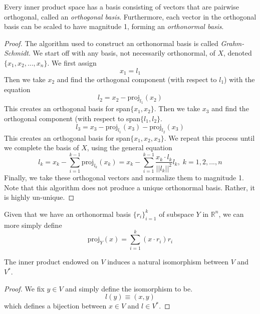 \documentclass{article}
\begin{document}
  \begin{theorem}
    Every inner product space has a basis consisting of vectors that are pairwise orthogonal, called an \textit{orthogonal basis}. Furthermore, each vector in the orthogonal basis can be scaled to have magnitude 1, forming an \textit{orthonormal basis}.  
  \end{theorem}

  \begin{proof}
    The algorithm used to construct an orthonormal basis is called \textit{Grahm-Schmidt}. We start off with any basis, not necessarily orthonormal, of $X$, denoted $\{x_1, x_2, ..., x_n\}$. We first assign 
    \begin{equation}
      x_1 = l_1
    \end{equation}
    Then we take $x_2$ and find the orthogonal component (with respect to $l_1$) with the equation
    \begin{equation}
      l_2 = x_2 - \text{proj}_{l_1} (x_2)
    \end{equation}
    This creates an orthogonal basis for span$\{x_1, x_2\}$. Then we take $x_3$ and find the orthogonal component (with respect to span$\{l_1, l_2\}$. 
    \begin{equation}
      l_3 = x_3 - \text{proj}_{l_1} (x_3) - \text{proj}_{l_2} (x_3)
    \end{equation}
    This creates an orthogonal basis for span$\{x_1, x_2, x_3\}$. We repeat this process until we complete the basis of $X$, using the general equation
    \begin{equation}
      l_k = x_k - \sum_{i=1}^{k-1} \text{proj}_{l_k} (x_k) = x_k - \sum_{i=1}^{k-1} \frac{x_k \cdot l_k}{||l_k||^2} l_k, \; k = 1, 2, ..., n
    \end{equation}
    Finally, we take these orthogonal vectors and normalize them to magnitude 1. Note that this algorithm does not produce a unique orthonormal basis. Rather, it is highly un-unique. 
  \end{proof}

  Given that we have an orthonormal basis $\{r_i\}_{i=1}^k$ of subspace $Y$ in $\mathbb{R}^n$, we can more simply define 
  \begin{equation}
    \text{proj}_Y (x) = \sum_{i=1}^k (x \cdot r_i) r_i
  \end{equation}

  \begin{theorem}
    The inner product endowed on $V$ induces a natural isomorphism between $V$ and $V^*$. 
  \end{theorem}
  \begin{proof}
    We fix $y \in V$ and simply define the isomorphism to be. 
    \begin{equation}
      l(y) \equiv (x, y)
    \end{equation}
    which defines a bijection between $x \in V$ and $l \in V^*$. 
  \end{proof}
\end{document}
